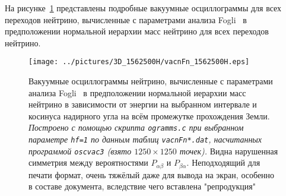На рисунке~\ref{vacn3DFn} представлены подробные вакуумные осциллограммы для всех переходов нейтрино, вычисленные с параметрами анализа Fogli~\cite{Fogli:2012ua} в предположении нормальной иерархии масс нейтрино для всех переходов нейтрино.
\clearpage
\begin{figure}[!ht]
\begin{comment}
\texttt{[image: ../pictures/3D\_1562500H/vacnFn\_ee.eps]}
\texttt{[image: ../pictures/3D\_1562500H/vacnFn\_em.eps]}
\texttt{[image: ../pictures/3D\_1562500H/vacnFn\_et.eps]}
\texttt{[image: ../pictures/3D\_1562500H/vacnFn\_me.eps]}
\texttt{[image: ../pictures/3D\_1562500H/vacnFn\_mm.eps]}
\texttt{[image: ../pictures/3D\_1562500H/vacnFn\_mt.eps]}
\texttt{[image: ../pictures/3D\_1562500H/vacnFn\_te.eps]}
\texttt{[image: ../pictures/3D\_1562500H/vacnFn\_tm.eps]}
\texttt{[image: ../pictures/3D\_1562500H/vacnFn\_tt.eps]}
\end{comment}
\texttt{[image: ../pictures/3D\_1562500H/vacnFn\_1562500H.eps]}
\caption{Вакуумные осциллограммы нейтрино, вычисленные с параметрами анализа Fogli~\cite{Fogli:2012ua} в предположении нормальной иерархии масс нейтрино в зависимости от энергии на выбранном интервале и косинуса надирного угла на всём промежутке прохождения Земли. \textit{Построено с помощью скрипта \texttt{ogramms.c} при выбранном параметре \texttt{hf=1} по данным таблиц \texttt{vacnFn*.dat}, насчитанных программой \texttt{oscvac3} (взято $1250\times1250$ точек).} Видна нарушенная симметрия между вероятностями $P_{\alpha\beta}$ и $P_{\beta\alpha}$. {\color{magenta}Неподходящий для печати формат, очень тяжёлый даже для вывода на экран, особенно в составе документа, {\color{red}вследствие чего вставлена "репродукция"{}}}}
\label{vacn3DFn}
\end{figure}

